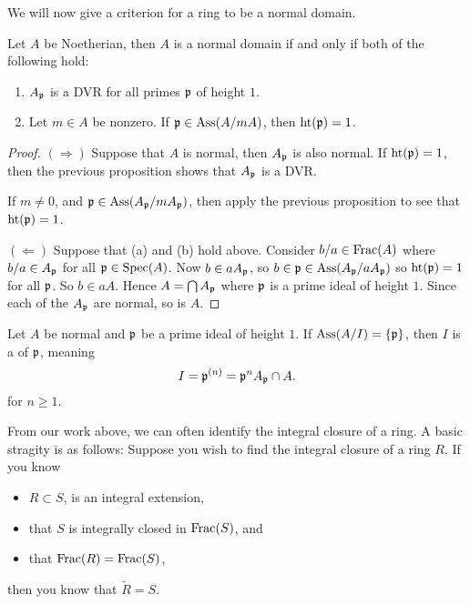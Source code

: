 \documentclass{ximera}
\begin{document}
We will now give a criterion for a ring to be a normal domain.

\begin{theorem}
  Let $A$ be Noetherian, then $A$ is a normal domain if and only if
  both of the following hold:
  \begin{enumerate}
  \item $A_{\mathfrak{p}}$ is a DVR for all primes $\mathfrak{p}$ of height $1$.
  \item Let $m\in A$ be nonzero. If $\mathfrak{p} \in \operatorname{Ass}(A/mA)$, then $\operatorname{ht}(\mathfrak{p}) = 1$.
  \end{enumerate}
  \begin{proof}
    $(\Rightarrow)$ Suppose that $A$ is normal, then $A_{\mathfrak{p}}$ is also
    normal. If $\operatorname{ht}(\mathfrak{p}) = 1$, then the previous proposition shows that
    $A_{\mathfrak{p}}$ is a DVR.

    If $m\ne 0$, and $\mathfrak{p} \in \operatorname{Ass}(A_{\mathfrak{p}}/mA_{\mathfrak{p}})$, then apply the previous
    proposition to see that $\operatorname{ht}(\mathfrak{p}) = 1$.

    $(\Leftarrow)$ Suppose that (a) and (b) hold above. Consider
    $b/a\in\operatorname{Frac}(A)$ where $b/a\in A_{\mathfrak{p}}$ for all $\mathfrak{p}\in\operatorname{Spec}(A)$. Now
    $b\in a A_{\mathfrak{p}}$, so $b\in \mathfrak{p}\in \operatorname{Ass}(A_{\mathfrak{p}}/aA_{\mathfrak{p}})$ so $\operatorname{ht}(\mathfrak{p}) = 1$
    for all $\mathfrak{p}$.  So $b\in a A$. Hence $A = \bigcap A_{\mathfrak{p}}$ where $\mathfrak{p}$
    is a prime ideal of height $1$. Since each of the $A_{\mathfrak{p}}$ are
    normal, so is $A$.
  \end{proof}
\end{theorem}


\begin{corollary}
  Let $A$ be normal and $\mathfrak{p}$ be a prime ideal of height $1$. If
  $\operatorname{Ass}(A/I) = \{\mathfrak{p}\}$, then $I$ is a  of $\mathfrak{p}$,
  meaning
  \[
  I = \mathfrak{p}^{(n)} = \mathfrak{p}^n A_{\mathfrak{p}} \cap A.
  \]
  for  $n\ge 1$.
\end{corollary}



From our work above, we can often identify the integral closure of a
ring. A basic stragity is as follows: Suppose you wish to find the
integral closure of a ring $R$. If you know
\begin{itemize}
\item $R\subset S$, is an integral extension,
\item that $S$ is integrally closed in $\operatorname{Frac}(S)$, and
\item that $\operatorname{Frac}(R) = \operatorname{Frac}(S)$, 
\end{itemize}
then you know that $\tilde{R} = S$.








\end{document}
